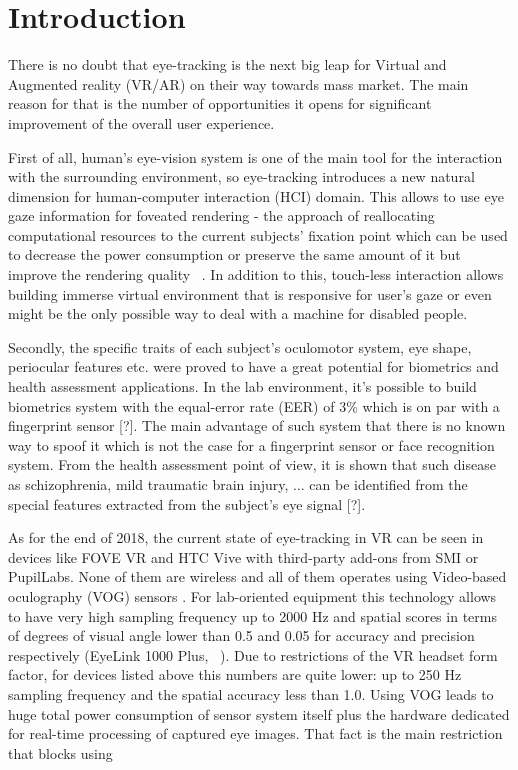 \section{Introduction}


There is no doubt that eye-tracking is the next big leap for Virtual and Augmented reality (VR/AR) on their way towards mass market. The main reason for that is the number of opportunities it opens for significant improvement of the overall user experience.

First of all, human's eye-vision system is one of the main tool for the interaction with the surrounding environment, so eye-tracking introduces a new natural dimension for human-computer interaction (HCI) domain. This allows to use eye gaze information for foveated rendering - the approach of reallocating computational resources to the current subjects' fixation point which can be used to decrease the power consumption or preserve the same amount of it but improve the rendering quality  ~\cite{guenter2012foveated}. In addition to this, touch-less interaction allows building immerse virtual environment that is responsive for user's gaze or even might be the only possible way to deal with a machine for disabled people. 

Secondly, the specific traits of each subject's oculomotor system, eye shape, periocular features etc. were proved to have a great potential for biometrics and health assessment applications. In the lab environment, it's possible to build biometrics system with the equal-error rate (EER) of 3\% which is on par with a fingerprint sensor [?]. The main advantage of such system that there is no known way to spoof it which is not the case for a fingerprint sensor or face recognition system. From the health assessment point of view, it is shown that such disease as schizophrenia, mild traumatic brain injury, ... can be identified from the special features extracted from the subject's eye signal [?].  

As for the end of 2018, the current state of eye-tracking in VR can be seen in devices like FOVE VR and HTC Vive with third-party add-ons from SMI or PupilLabs. None of them are wireless and all of them operates using Video-based oculography (VOG) sensors . For lab-oriented equipment this technology allows to have very high sampling frequency up to 2000 Hz and spatial scores in terms of degrees of visual angle lower than 0.5\textdegree{} and 0.05\textdegree{} for accuracy and precision respectively (EyeLink 1000 Plus, ~\cite{EyeLink1000P}). Due to restrictions of the VR headset form factor, for devices listed above this numbers are quite lower: up to 250 Hz sampling frequency and the spatial accuracy less than 1.0\textdegree{}. Using VOG leads to huge total power consumption of sensor system itself plus the hardware dedicated for real-time processing of captured eye images. That fact is the main restriction that blocks using      

